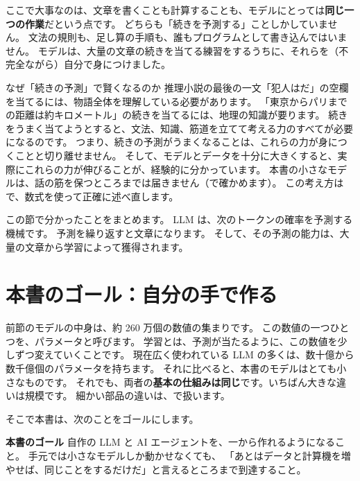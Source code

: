 ここで大事なのは、文章を書くことも計算することも、モデルにとっては\textbf{同じ一つの作業}だという点です。
どちらも「続きを予測する」ことしかしていません。
文法の規則も、足し算の手順も、誰もプログラムとして書き込んではいません。
モデルは、大量の文章の続きを当てる練習をするうちに、それらを（不完全ながら）自分で身につけました。

\begin{intuition}{なぜ「続きの予測」で賢くなるのか}
推理小説の最後の一文「犯人は\underline{\hspace{2em}}だ」の空欄を当てるには、物語全体を理解している必要があります。
「東京からパリまでの距離は約\underline{\hspace{2em}}キロメートル」の続きを当てるには、地理の知識が要ります。
続きをうまく当てようとすると、文法、知識、筋道を立てて考える力のすべてが必要になるのです。
つまり、続きの予測がうまくなることは、これらの力が身につくことと切り離せません。
そして、モデルとデータを十分に大きくすると、実際にこれらの力が伸びることが、経験的に分かっています。
本書の小さなモデルは、話の筋を保つところまでは届きません（で確かめます）。
この考え方はで、数式を使って正確に述べ直します。
\end{intuition}

この節で分かったことをまとめます。
LLM は、次のトークンの確率を予測する機械です。
予測を繰り返すと文章になります。
そして、その予測の能力は、大量の文章から学習によって獲得されます。

\section{本書のゴール：自分の手で作る}\label{sec:intro-goal}

前節のモデルの中身は、約 260 万個の数値の集まりです。
この数値の一つひとつを、パラメータと呼びます。
学習とは、予測が当たるように、この数値を少しずつ変えていくことです。
現在広く使われている LLM の多くは、数十億から数千億個のパラメータを持ちます。
それに比べると、本書のモデルはとても小さなものです。
それでも、両者の\textbf{基本の仕組みは同じ}です。いちばん大きな違いは規模です。
細かい部品の違いは、で扱います。

そこで本書は、次のことをゴールにします。

\begin{center}
\begin{tcolorbox}[bookbox,colback=figblue!35,borderline west={2.5pt}{0pt}{bookblue},width=0.92\linewidth]
\textbf{本書のゴール}\quad
自作の LLM と AI エージェントを、一から作れるようになること。
手元では小さなモデルしか動かせなくても、
「あとはデータと計算機を増やせば、同じことをするだけだ」と言えるところまで到達すること。
\end{tcolorbox}
\end{center}

